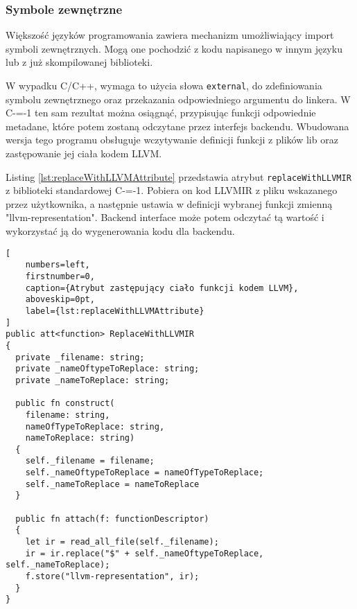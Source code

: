 \subsubsection{Symbole zewnętrzne}
Większość języków programowania zawiera mechanizm umożliwiający import symboli zewnętrznych.
Mogą one pochodzić z kodu napisanego w innym języku lub z już skompilowanej biblioteki.

W wypadku C/C++, wymaga to użycia słowa \lstinline{external}, do zdefiniowania symbolu zewnętrznego oraz przekazania odpowiedniego argumentu do linkera.
W C-=-1 ten sam rezultat można osiągnąć, przypisując funkcji odpowiednie metadane, które potem zostaną odczytane przez interfejs backendu.
Wbudowana wersja tego programu obsługuje wczytywanie definicji funkcji z plików lib oraz zastępowanie jej ciała kodem LLVM.

Listing \ref{lst:replaceWithLLVMAttribute} przedstawia atrybut \lstinline{replaceWithLLVMIR} z biblioteki standardowej C-=-1. 
Pobiera on kod LLVMIR z pliku wskazanego przez użytkownika, a następnie ustawia w definicji wybranej funkcji zmienną "llvm-representation".
Backend interface może potem odczytać tą wartość i wykorzystać ją do wygenerowania kodu dla backendu.


\begin{lstlisting}[
    numbers=left,
    firstnumber=0,
    caption={Atrybut zastępujący ciało funkcji kodem LLVM},
    aboveskip=0pt,
    label={lst:replaceWithLLVMAttribute}
]
public att<function> ReplaceWithLLVMIR
{
  private _filename: string;
  private _nameOftypeToReplace: string;
  private _nameToReplace: string;

  public fn construct(
    filename: string,
    nameOfTypeToReplace: string,
    nameToReplace: string)
  {
    self._filename = filename;
    self._nameOftypeToReplace = nameOfTypeToReplace;
    self._nameToReplace = nameToReplace
  }

  public fn attach(f: functionDescriptor)
  {
    let ir = read_all_file(self._filename);
    ir = ir.replace("$" + self._nameOftypeToReplace, self._nameToReplace);
    f.store("llvm-representation", ir);
  }
}

\end{lstlisting}
